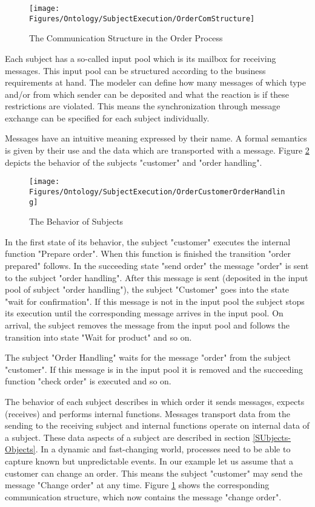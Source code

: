 \begin{figure}[htbp]
	\centering
	\texttt{[image: Figures/Ontology/SubjectExecution/OrderComStructure]}
	\caption[The Communication Structure in the Order Process]{The Communication Structure in the Order Process}
	\label{fig:ordercomstructure}
\end{figure}

Each subject has a so-called input pool which is its mailbox for receiving messages. This input pool can be structured according to the business requirements at hand. The modeler can define how many messages of which type and/or from which sender can be deposited and what the reaction is if these restrictions are violated. This means the synchronization through message exchange can be specified for each subject individually.

Messages have an intuitive meaning expressed by their name. A formal semantics is given by their use and the data which are transported with a message. Figure \ref{fig:ordercustomerorderhandling} depicts the behavior of the subjects "customer" and "order handling".

\begin{figure}[htbp]
	\centering
	\texttt{[image: Figures/Ontology/SubjectExecution/OrderCustomerOrderHandling]}
	\caption[The Behavior of Subjects]{The Behavior of Subjects}
	\label{fig:ordercustomerorderhandling}
\end{figure}

In the first state of its behavior, the subject "customer" executes the internal function "Prepare order". When this function is finished the transition "order prepared" follows. In the succeeding state "send order" the message "order" is sent to the subject "order handling". After this message is sent (deposited in the input pool of subject "order handling"), the subject "Customer" goes into the state "wait for confirmation". If this message is not in the input pool the subject stops its execution until the corresponding message arrives in the input pool. On arrival, the subject removes the message from the input pool and follows the transition into state "Wait for product" and so on.

The subject "Order Handling" waits for the message "order" from the subject "customer". If this message is in the input pool it is removed and the succeeding function "check order" is executed and so on.

The behavior of each subject describes in which order it sends messages, expects (receives) and performs internal functions. Messages transport data from the sending to the receiving subject and internal functions operate on internal data of a subject. These data aspects of a subject are described in section \ref{SUbjects-Objects}. In a dynamic and fast-changing world, processes need to be able to capture known but unpredictable events. In our example let us assume that a customer can change an order. This means the subject "customer" may send the message "Change order" at any time. Figure \ref{fig:ordercomstructure} shows the corresponding communication structure, which now contains the message "change order".

